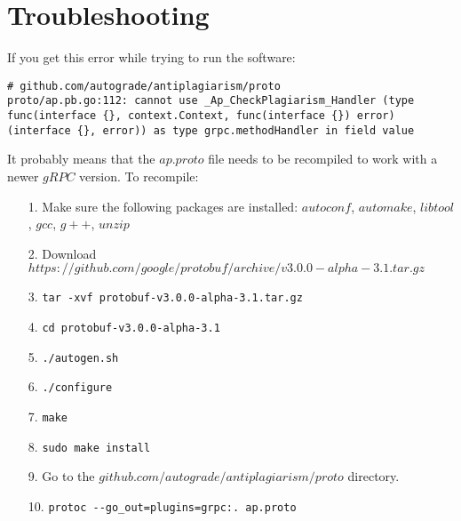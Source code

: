 \documentclass[12pt]{article}
\begin{document}
	\section{Troubleshooting}
		If you get this error while trying to run the software:
		
		\begin{lstlisting}[breaklines=true]	
# github.com/autograde/antiplagiarism/proto
proto/ap.pb.go:112: cannot use _Ap_CheckPlagiarism_Handler (type func(interface {}, context.Context, func(interface {}) error) (interface {}, error)) as type grpc.methodHandler in field value
		\end{lstlisting}
		
		It probably means that the $ap.proto$ file needs to be recompiled to work with a newer $gRPC$ version. To recompile:
		
		\begin{itemize}
		\item[1.] Make sure the following packages are installed: $autoconf$, $automake$, $libtool$, $gcc$, $g++$, $unzip$
		\item[2.] Download $https://github.com/google/protobuf/archive/v3.0.0-alpha-3.1.tar.gz$
		\item[3.] \verb|tar -xvf protobuf-v3.0.0-alpha-3.1.tar.gz|
		\item[4.] \verb|cd protobuf-v3.0.0-alpha-3.1|
		\item[5.] \verb|./autogen.sh|
		\item[6.] \verb|./configure|
		\item[7.] \verb|make|
		\item[8.] \verb|sudo make install|
		\item[9.] Go to the $github.com/autograde/antiplagiarism/proto$ directory.
		\item[10.] \verb|protoc --go_out=plugins=grpc:. ap.proto|	
		\end{itemize}
\end{document}
